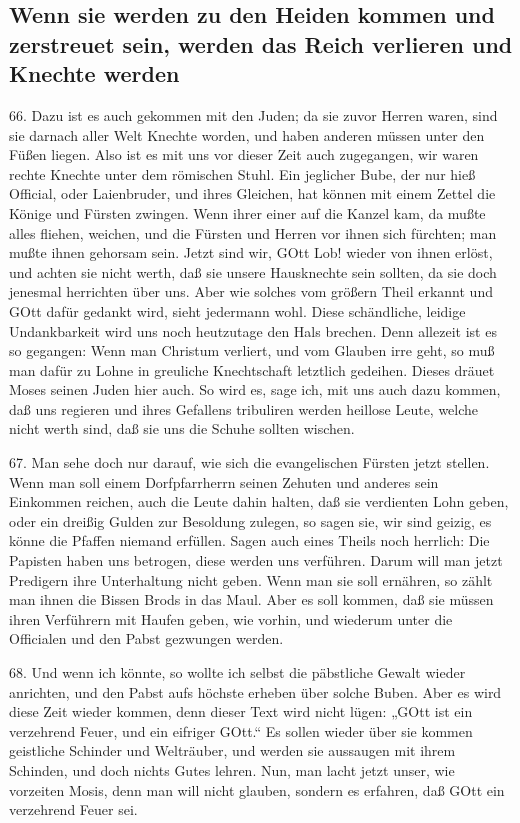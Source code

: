 \subsection[Wenn sie werden zu den Heiden kommen und zerstreuet]{Wenn sie werden zu den Heiden kommen und zerstreuet sein, werden das Reich verlieren und Knechte werden}

66. Dazu ist es auch gekommen mit den Juden; da sie zuvor Herren waren, sind sie darnach aller Welt Knechte worden, und haben anderen müssen unter den Füßen liegen. Also ist es mit uns vor dieser Zeit auch zugegangen, wir waren rechte Knechte unter dem römischen Stuhl. Ein jeglicher Bube, der nur hieß Official, oder Laienbruder, und ihres Gleichen, hat können mit einem Zettel die Könige und Fürsten zwingen. Wenn ihrer einer auf die Kanzel kam, da mußte alles fliehen, weichen, und die Fürsten und Herren vor ihnen sich fürchten; man mußte ihnen gehorsam sein. Jetzt sind wir, GOtt Lob! wieder von ihnen erlöst, und achten sie nicht werth, daß sie unsere Hausknechte sein sollten, da sie doch jenesmal herrichten über uns. Aber wie solches vom größern Theil erkannt und GOtt dafür gedankt wird, sieht jedermann wohl. Diese schändliche, leidige Undankbarkeit wird uns noch heutzutage den Hals brechen. Denn allezeit ist es so gegangen: Wenn man Christum verliert, und vom Glauben irre geht, so muß man dafür zu Lohne in greuliche Knechtschaft letztlich gedeihen. Dieses dräuet Moses seinen Juden hier auch. So wird es, sage ich, mit uns auch dazu kommen, daß uns regieren und ihres Gefallens tribuliren werden heillose Leute, welche nicht werth sind, daß sie uns die Schuhe sollten wischen.

67. Man sehe doch nur darauf, wie sich die evangelischen Fürsten jetzt stellen. Wenn man soll einem Dorfpfarrherrn seinen Zehuten und anderes sein Einkommen reichen, auch die Leute dahin halten, daß sie verdienten Lohn geben, oder ein dreißig Gulden zur Besoldung zulegen, so sagen sie, wir sind geizig, es könne die Pfaffen niemand erfüllen. Sagen auch eines Theils noch herrlich: Die Papisten haben uns betrogen, diese werden uns verführen. Darum will man jetzt Predigern ihre Unterhaltung nicht geben. Wenn man sie soll ernähren, so zählt man ihnen die Bissen Brods in das Maul. Aber es soll kommen, daß sie müssen ihren Verführern mit Haufen geben, wie vorhin, und wiederum unter die Officialen und den Pabst gezwungen werden.

68. Und wenn ich könnte, so wollte ich selbst die päbstliche Gewalt wieder anrichten, und den Pabst aufs höchste erheben über solche Buben. Aber es wird diese Zeit wieder kommen, denn dieser Text wird nicht lügen: „GOtt ist ein verzehrend Feuer, und ein eifriger GOtt.“ Es sollen wieder über sie kommen geistliche Schinder und Welträuber, und werden sie aussaugen mit ihrem Schinden, und doch nichts Gutes lehren. Nun, man lacht jetzt unser, wie vorzeiten Mosis, denn man will nicht glauben, sondern es erfahren, daß GOtt ein verzehrend Feuer sei.

